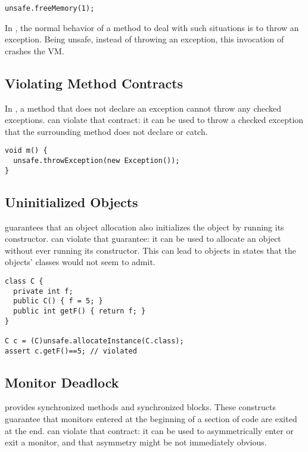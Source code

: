 \begin{lstlisting}[style=java,caption=\smu{} can crash the VM]
unsafe.freeMemory(1);
\end{lstlisting}

In \java{}, the normal behavior of a method to deal with such situations
is to throw an exception.
Being unsafe, instead of throwing an exception,
this invocation of  crashes the VM.

\subsection*{Violating Method Contracts}

In \java{}, a method that does not declare an exception cannot throw any
checked exceptions.
\unsafe{} can violate that contract:
it can be used to throw a checked exception that the surrounding method
does not declare or catch.

\begin{lstlisting}[style=java,caption=\smu{} can violate a method contract]
void m() {
  unsafe.throwException(new Exception());
}
\end{lstlisting}

\subsection*{Uninitialized Objects}

\java{} guarantees that an object allocation also initializes the object
by running its constructor.
\unsafe{} can violate that guarantee:
it can be used to allocate an object without ever running its
constructor.
This can lead to objects in states that the objects' classes would
not seem to admit.

\begin{lstlisting}[style=java,caption=\smu{} can lead to uninitialized objects]
class C {
  private int f;
  public C() { f = 5; }
  public int getF() { return f; }
}

C c = (C)unsafe.allocateInstance(C.class);
assert c.getF()==5; // violated
\end{lstlisting}

\subsection*{Monitor Deadlock}

\java{} provides synchronized methods and synchronized blocks.
These constructs guarantee that monitors entered at the beginning
of a section of code are exited at the end.
\unsafe{} can violate that contract:
it can be used to asymmetrically enter or exit a monitor,
and that asymmetry might be not immediately obvious.

